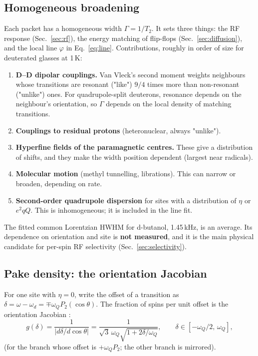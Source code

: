 \documentclass[11pt]{article}
\newcommand{\Pt}{P_2}
\begin{document}
\subsection{Homogeneous broadening}
\label{sec:homogeneous}
Each packet has a homogeneous width $\Gamma=1/T_2$. It sets three things: the RF response
(Sec.~\ref{sec:rf}), the energy matching of flip-flops (Sec.~\ref{sec:diffusion}), and the local
line $\varphi$ in Eq.~\eqref{eq:line}. Contributions, roughly in order of size for deuterated
glasses at 1\,K:
\begin{enumerate}
\item \textbf{D--D dipolar couplings.} Van Vleck's second moment \cite{VanVleck1948,Abragam1961}
weights neighbours whose transitions are resonant ("like") $9/4$ times more than non-resonant
("unlike") ones. For quadrupole-split deuterons, resonance depends on the neighbour's
orientation, so $\Gamma$ depends on the local density of matching transitions.
\item \textbf{Couplings to residual protons} (heteronuclear, always "unlike").
\item \textbf{Hyperfine fields of the paramagnetic centres.} These give a distribution of shifts,
and they make the width position dependent (largest near radicals).
\item \textbf{Molecular motion} (methyl tunnelling, librations). This can narrow or broaden,
depending on rate.
\item \textbf{Second-order quadrupole dispersion} for sites with a distribution of $\eta$ or
$e^2qQ$. This is inhomogeneous; it is included in the line fit.
\end{enumerate}
The fitted common Lorentzian HWHM for d-butanol, 1.45\,kHz, is an average. Its dependence on
orientation and site is \textbf{not measured}, and it is the main physical candidate for
per-spin RF selectivity (Sec.~\ref{sec:selectivity}).

\subsection{Pake density: the orientation Jacobian}
\label{sec:pake}
For one site with $\eta=0$, write the offset of a transition as
$\delta=\omega-\omega_d=\mp\omega_Q\Pt(\cos\theta)$. The fraction of spins per unit offset is
the orientation Jacobian \cite{Pake1948}:
\begin{equation}
g(\delta)=\frac{1}{|d\delta/d\cos\theta|}=\frac{1}{\sqrt3\,\omega_Q\sqrt{1+2\delta/\omega_Q}},
\qquad \delta\in[-\omega_Q/2,\,\omega_Q],
\label{eq:pakedensity}
\end{equation}
(for the branch whose offset is $+\omega_Q\Pt$; the other branch is mirrored).
\end{document}
